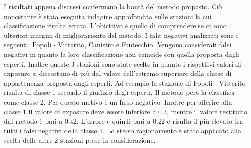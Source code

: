 I risultati appena discussi confermano la bontà del metodo proposto. Ciò nonostante è stata eseguita indagine approfondita sulle stazioni la cui classificazione risulta errata. L'obiettivo è quello di comprendere se ci sono ulteriori margini di miglioramento del metodo.
I falsi negativi analizzati sono i seguenti: Popoli - Vittorito, Canistro e Fontecchio. Vengono considerati falsi negativi in quanto la loro classificazione non coincide con quella proposta dagli esperti. Inoltre queste 3 stazioni sono state scelte in quanto i rispettivi valori di exposure  si discostano di più dal valore dell'estremo superiore della classe di appartenenza proposta dagli esperti. Ad esempio la stazione di Popoli - Vittorito risulta di classe 1 secondo il giudizio degli esperti. Il metodo però la classifica come classe 2. Per questo motivo è un falso negativo. Inoltre per afferire alla classe 1 il valore di exposure deve essere inferiore a 0.2, mentre il valore restituito dal metodo è pari a 0.42. L'errore è quindi pari a 0.22 e risulta il più elevato tra tutti i falsi negativi della classe 1. Lo stesso ragionamento è stato applicato alla scelta delle altre 2 stazioni prese in considerazione. 

